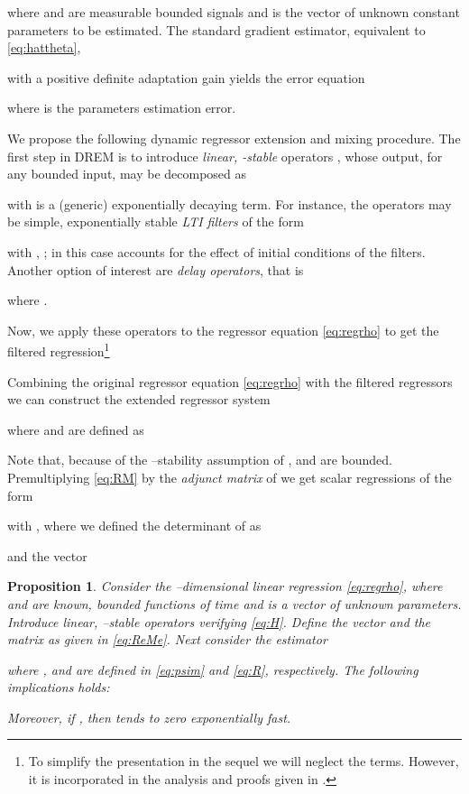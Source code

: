 \documentclass[journal, onecolumn]{IEEEtran}
\newtheorem{prop}{Proposition}
\begin{document}
where  and  are measurable bounded signals and  is the vector of unknown constant parameters to be estimated. The standard gradient estimator, equivalent to \eqref{eq:hattheta},

with a positive definite adaptation gain  yields the error equation

where  is the parameters estimation error.

We propose the following dynamic regressor extension and mixing procedure. The first step in DREM is to introduce  {\em linear, -stable} operators , whose output, for any bounded input, may be decomposed as

with  is a (generic) exponentially decaying term. For instance, the operators  may be simple, exponentially stable {\em LTI filters} of the form

with , ; in this case  accounts for the effect of initial conditions of the filters. Another option of interest are {\em delay operators}, that is

where .

Now, we apply these operators to the regressor equation \eqref{eq:regrho} to get the filtered regression\footnote{To simplify the presentation in the sequel we will neglect the  terms. However, it is incorporated in the analysis and proofs given in \cite{Aranovskiy2015DREM}.}


Combining the original regressor equation \eqref{eq:regrho} with the  filtered regressors we can construct the extended regressor system

where  and  are defined as

Note that, because of the --stability assumption of ,  and  are bounded. Premultiplying \eqref{eq:RM} by the {\em adjunct matrix} of  we get  scalar regressions of the form 

with , where we defined the determinant of  as

and the vector 


\begin{prop} \label{prop:DREM}
Consider the --dimensional linear regression \eqref{eq:regrho}, where  and  are known, bounded functions of time and  is a vector of unknown parameters. Introduce   linear, --stable operators  verifying \eqref{eq:H}. Define the vector  and the matrix  as given in \eqref{eq:ReMe}. 
Next consider the estimator

where ,  and  are defined in \eqref{eq:psim} and \eqref{eq:R}, respectively. The following implications holds:

Moreover, if , then  tends to zero exponentially fast. \end{prop}
\end{document}
